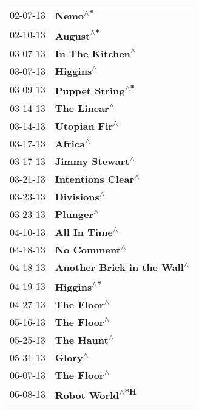 \begin{supertabular}{p{0.25\columnwidth}p{0.75\columnwidth}}
 02-07-13 &                        \textbf{Nemo\textsuperscript{$\wedge$*}} \\
 02-10-13 &                      \textbf{August\textsuperscript{$\wedge$*}} \\
 03-07-13 &               \textbf{In The Kitchen\textsuperscript{$\wedge$}} \\
 03-07-13 &                      \textbf{Higgins\textsuperscript{$\wedge$}} \\
 03-09-13 &               \textbf{Puppet String\textsuperscript{$\wedge$*}} \\
 03-14-13 &                   \textbf{The Linear\textsuperscript{$\wedge$}} \\
 03-14-13 &                  \textbf{Utopian Fir\textsuperscript{$\wedge$}} \\
 03-17-13 &                       \textbf{Africa\textsuperscript{$\wedge$}} \\
 03-17-13 &                \textbf{Jimmy Stewart\textsuperscript{$\wedge$}} \\
 03-21-13 &             \textbf{Intentions Clear\textsuperscript{$\wedge$}} \\
 03-23-13 &                    \textbf{Divisions\textsuperscript{$\wedge$}} \\
 03-23-13 &                      \textbf{Plunger\textsuperscript{$\wedge$}} \\
 04-10-13 &                  \textbf{All In Time\textsuperscript{$\wedge$}} \\
 04-18-13 &                   \textbf{No Comment\textsuperscript{$\wedge$}} \\
 04-18-13 &    \textbf{Another Brick in the Wall\textsuperscript{$\wedge$}} \\
 04-19-13 &                     \textbf{Higgins\textsuperscript{$\wedge$*}} \\
 04-27-13 &                    \textbf{The Floor\textsuperscript{$\wedge$}} \\
 05-16-13 &                    \textbf{The Floor\textsuperscript{$\wedge$}} \\
 05-25-13 &                    \textbf{The Haunt\textsuperscript{$\wedge$}} \\
 05-31-13 &                        \textbf{Glory\textsuperscript{$\wedge$}} \\
 06-07-13 &                    \textbf{The Floor\textsuperscript{$\wedge$}} \\
 06-08-13 &                \textbf{Robot World\textsuperscript{$\wedge$*H}} \\

\end{supertabular}
